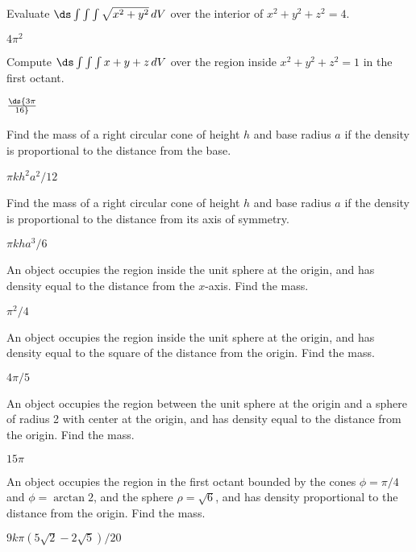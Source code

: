 \begin{enumialphparenastyle}
\begin{ex}
Evaluate $\ds\int\int\int \sqrt{x^2+y^2}\,dV$
over the interior of $x^2+y^2+z^2=4$.
\begin{sol}
$4\pi^2$
\end{sol}
\end{ex}

\begin{ex}
Compute $\ds\int\int\int
x+y+z\,dV$ over the region inside
$x^2+y^2+z^2 = 1$ in the first octant.
\begin{sol}
$\ds {3\pi\over16}$
\end{sol}
\end{ex}

\begin{ex}
Find the mass of a right circular cone of height $h$ and
base radius $a$ if the density is proportional to the distance from
the base.
\begin{sol}
$\pi kh^2a^2/12$
\end{sol}
\end{ex}

\begin{ex}
Find the mass of a right circular cone of height $h$ and
base radius $a$ if the density is proportional to the distance from
its axis of symmetry.
\begin{sol}
$\pi kha^3/6$
\end{sol}
\end{ex}

\begin{ex}
An object occupies the region inside the unit sphere at the
origin, and has density equal to the distance from the $x$-axis. Find
the mass.
\begin{sol}
$\pi^2/4$
\end{sol}
\end{ex}

\begin{ex}
An object occupies the region inside the unit sphere at the
origin, and has density equal to the square of the distance from the
origin. Find the mass.
\begin{sol}
$4\pi/5$
\end{sol}
\end{ex}

\begin{ex}
An object occupies the region between the unit sphere at the
origin and a sphere of radius 2 with center at the origin, and has
density equal to the distance from the origin. Find the mass.
\begin{sol}
$15\pi$
\end{sol}
\end{ex}

\begin{ex}
An object occupies the region in the first octant bounded by
the cones $\phi = \pi/4$ and $\phi = \arctan 2$, and the sphere $\rho
= \sqrt{6}$, and has density proportional to the distance from the
origin. Find the mass.
\begin{sol}
$9k\pi(5\sqrt2-2\sqrt5)/20$
\end{sol}
\end{ex}

\end{enumialphparenastyle}
